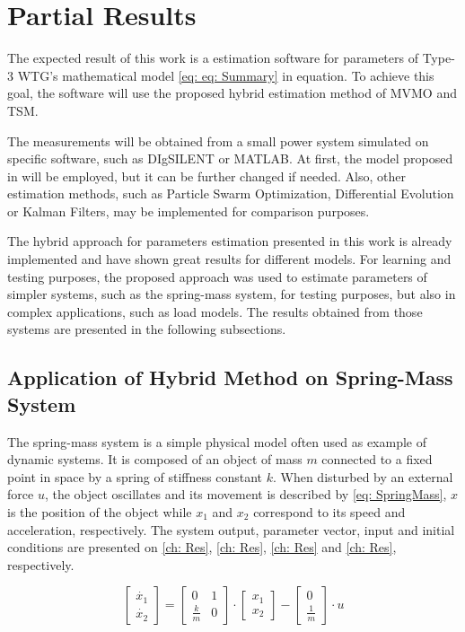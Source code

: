 \chapter{Partial Results}

\label{ch: Res}

The expected result of this work is a estimation software for parameters of Type-3 WTG's mathematical model \eqref{eq: eq: Summary} in equation. To achieve this goal, the software will use the proposed hybrid estimation method of MVMO and TSM.

The measurements will be obtained from a small power system simulated on specific software, such as DIgSILENT or MATLAB. At first, the model proposed in \cite{Erlich2012} will be employed, but it can be further changed if needed. Also, other estimation methods, such as Particle Swarm Optimization, Differential Evolution or Kalman Filters, may be implemented for comparison purposes.

The hybrid approach for parameters estimation presented in this work is already implemented and have shown great results for different models. For learning and testing purposes, the proposed approach was used to estimate parameters of simpler systems, such as the spring-mass system, for testing purposes, but also in complex applications, such as load models. The results obtained from those systems are presented in the following subsections.

\section{Application of Hybrid Method on Spring-Mass System}

The spring-mass system is a simple physical model often used as example of dynamic systems. It is composed of an object of mass $m$ connected to a fixed point in space by a spring of stiffness constant $k$. When disturbed by an external force $u$, the object oscillates and its movement is described by \eqref{eq: SpringMass}, $x$ is the position of the object while $x_{1}$ and $x_{2}$ correspond to its speed and acceleration, respectively. The system output, parameter vector, input and initial conditions are presented on \eqref{ch: Res}, \eqref{ch: Res}, \eqref{ch: Res} and \eqref{ch: Res}, respectively.

\begin{equation}
	\begin{bmatrix}
		\dot{x_{1}} \\
		\dot{x_{2}}
	\end{bmatrix} = 
	\begin{bmatrix}
		0 & 1 \\
		\frac{k}{m} & 0
	\end{bmatrix}\cdot
	\begin{bmatrix}
		x_{1} \\
		x_{2}
	\end{bmatrix} -
	\begin{bmatrix}
		0 \\
		\frac{1}{m}
	\end{bmatrix}
	\cdot
	u
	\label{eq: SpringMass}
\end{equation}

